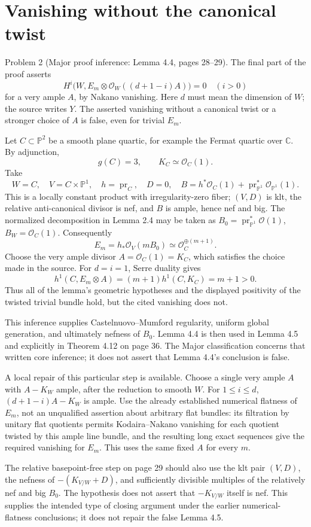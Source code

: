 \documentclass[10pt]{article}
\begin{document}
\section*{Vanishing without the canonical twist}
Problem 2 (Major proof inference: Lemma 4.4, pages 28–29).  The final part of the proof asserts \[H^i\bigl(W,E_m\otimes\mathcal O_W((d+1-i)A)\bigr)=0\quad(i>0)\] for a very ample \(A\), by Nakano vanishing. Here \(d\) must mean the dimension of \(W\); the source writes \(Y\). The asserted vanishing without a canonical twist or a stronger choice of \(A\) is false, even for trivial \(E_m\).\par
Let \(C\subset\mathbb P^2\) be a smooth plane quartic, for example the Fermat quartic over \(\mathbb C\). By adjunction, \[g(C)=3,\qquad K_C\simeq\mathcal O_C(1).\] Take \[W=C,\quad V=C\times\mathbb P^1,\quad h=\operatorname{pr}_C,\quad D=0,\quad
 B=h^*\mathcal O_C(1)+\operatorname{pr}_{\mathbb P^1}^*\mathcal O_{\mathbb P^1}(1).\] This is a locally constant product with irregularity-zero fiber; \((V,D)\) is klt, the relative anti-canonical divisor is nef, and \(B\) is ample, hence nef and big. The normalized decomposition in Lemma 2.4 may be taken as \(B_0=\operatorname{pr}_{\mathbb P^1}^*\mathcal O(1)\), \(B_W=\mathcal O_C(1)\). Consequently \[E_m=h_*\mathcal O_V(mB_0)\simeq\mathcal O_C^{\oplus(m+1)}.\] Choose the very ample divisor \(A=\mathcal O_C(1)=K_C\), which satisfies the choice made in the source. For \(d=i=1\), Serre duality gives \[h^1(C,E_m\otimes A)=(m+1)h^1(C,K_C)=m+1>0 .\] Thus all of the lemma’s geometric hypotheses and the displayed positivity of the twisted trivial bundle hold, but the cited vanishing does not.\par
This inference supplies Castelnuovo–Mumford regularity, uniform global generation, and ultimately nefness of \(B_0\). Lemma 4.4 is then used in Lemma 4.5 and explicitly in Theorem 4.12 on page 36. The Major classification concerns that written core inference; it does not assert that Lemma 4.4’s conclusion is false.\par
A local repair of this particular step is available. Choose a single very ample \(A\) with \(A-K_W\) ample, after the reduction to smooth \(W\). For \(1\le i\le d\), \((d+1-i)A-K_W\) is ample. Use the already established numerical flatness of \(E_m\), not an unqualified assertion about arbitrary flat bundles: its filtration by unitary flat quotients permits Kodaira–Nakano vanishing for each quotient twisted by this ample line bundle, and the resulting long exact sequences give the required vanishing for \(E_m\). This uses the same fixed \(A\) for every \(m\).\par
The relative basepoint-free step on page 29 should also use the klt pair \((V,D)\), the nefness of \(- (K_{V/W}+D)\), and sufficiently divisible multiples of the relatively nef and big \(B_0\). The hypothesis does not assert that \(-K_{V/W}\) itself is nef. This supplies the intended type of closing argument under the earlier numerical-flatness conclusions; it does not repair the false Lemma 4.5.\par
\end{document}
